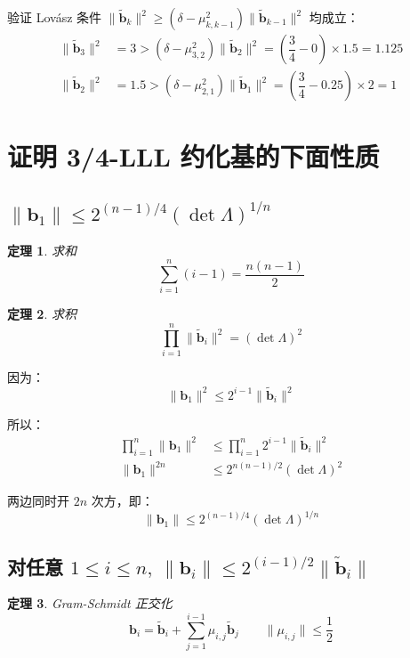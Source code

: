 \documentclass{article}
\newtheorem{theorem}{定理}
\begin{document}
验证 Lov\'asz 条件 $\|\tilde{\bm{b}}_{k}\|^2\geqslant(\delta-\mu_{k,k-1}^2)\|\tilde{\bm{b}}_{k-1}\|^2$ 均成立：
\begin{align*}
    \|\tilde{\bm{b}}_{3}\|^2&=3>(\delta-\mu_{3,2}^2)\|\tilde{\bm{b}}_{2}\|^2=\left(\dfrac{3}{4}-0\right)\times1.5=1.125
    \\
    \|\tilde{\bm{b}}_{2}\|^2&=1.5>(\delta-\mu_{2,1}^2)\|\tilde{\bm{b}}_{1}\|^2=\left(\dfrac{3}{4}-0.25\right)\times2=1
\end{align*}



\section{证明 3/4-LLL 约化基的下面性质}
\subsection{$\|\bm{b}_1\|\leqslant2^{(n-1)/4}(\det\Lambda)^{1/n}$}

\begin{theorem}
    求和
    \[ \sum_{i=1}^{n}(i-1)=\dfrac{n(n-1)}{2} \]
\end{theorem}

\begin{theorem}
    求积
    \[ \prod_{i=1}^{n}\|\tilde{\bm{b}}_{i}\|^2=(\det\Lambda)^2 \]
\end{theorem}

因为：
\[ \|\bm{b}_1\|^2\leqslant2^{i-1}\|\tilde{\bm{b}}_{i}\|^2 \]

所以：
\begin{align*}
    \prod_{i=1}^{n}\|\bm{b}_1\|^2&\leqslant\prod_{i=1}^{n}2^{i-1}\|\tilde{\bm{b}}_{i}\|^2
    \\
    \|\bm{b}_1\|^{2n}&\leqslant2^{n(n-1)/2}(\det\Lambda)^2
\end{align*}

两边同时开 $2n$ 次方，即：
\[ \|\bm{b}_1\|\leqslant2^{(n-1)/4}(\det\Lambda)^{1/n} \]



\subsection{对任意 $1\leqslant i\leqslant n,\ \|\bm{b}_i\|\leqslant2^{(i-1)/2}\|\tilde{\bm{b}}_i\|$}

\begin{theorem}
    Gram-Schmidt 正交化
    \[ \bm{b}_i=\tilde{\bm{b}}_i+\sum_{j=1}^{i-1}\mu_{i,j}\tilde{\bm{b}}_j\qquad\|\mu_{i,j}\|\leqslant\dfrac{1}{2} \]
\end{theorem}
\end{document}
